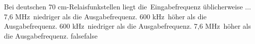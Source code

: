     {Bei deutschen 70 cm-Relaisfunkstellen liegt die Eingabefrequenz üblicherweise ...}
    {7,6 MHz niedriger als die Ausgabefrequenz.}
    {600 kHz höher als die Ausgabefrequenz.}
    {600 kHz niedriger als die Ausgabefrequenz.}
    {7,6 MHz höher als die Ausgabefrequenz.}
    {false}{false}